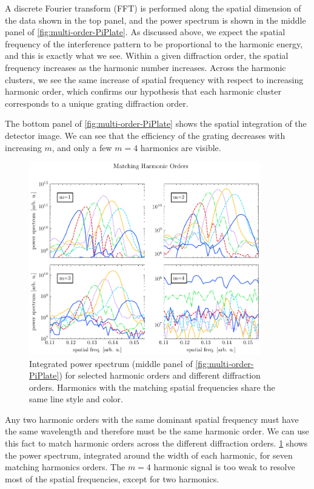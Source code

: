 A discrete Fourier transform (FFT) is performed along the spatial dimension of the data shown in the top panel, and the power spectrum is shown in the middle panel of \cref{fig:multi-order-PiPlate}. As discussed above, we expect the spatial frequency of the interference pattern to be proportional to the harmonic energy, and this is exactly what we see. Within a given diffraction order, the spatial frequency increases as the harmonic number increases. Across the harmonic clusters, we see the same increase of spatial frequency with respect to increasing harmonic order, which confirms our hypothesis that each harmonic cluster corresponds to a unique grating diffraction order.

The bottom panel of \cref{fig:multi-order-PiPlate} shows the spatial integration of the detector image. We can see that the efficiency of the grating decreases with increasing $m$, and only a few $m=4$ harmonics are visible.

\begin{figure}
	\centering
	\includegraphics[width=0.9\textwidth]{figures/chap2/twosource-matching-HO.pdf}
	\caption{Integrated power spectrum (middle panel of \cref{fig:multi-order-PiPlate}) for selected harmonic orders and different diffraction orders. Harmonics with the matching spatial frequencies share the same line style and color.}
	\label{fig:twosource-matching-HO}
\end{figure}

Any two harmonic orders with the same dominant spatial frequency must have the same wavelength and therefore must be the same harmonic order. We can use this fact to match harmonic orders across the different diffraction orders. \cref{fig:twosource-matching-HO} shows the power spectrum, integrated around the width of each harmonic, for seven matching harmonics orders. The $m=4$ harmonic signal is too weak to resolve most of the spatial frequencies, except for two harmonics.

